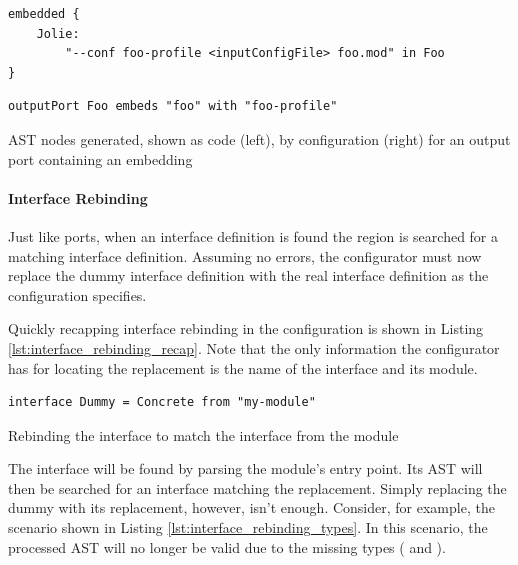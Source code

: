 \begin{listing}[H]
\begin{multicols}{2}

\begin{verbatim}
embedded {
    Jolie:
        "--conf foo-profile <inputConfigFile> foo.mod" in Foo
}
\end{verbatim}

\columnbreak

\begin{verbatim}
outputPort Foo embeds "foo" with "foo-profile"
\end{verbatim}

\end{multicols}

\caption{AST nodes generated, shown as code (left), by configuration (right)
    for an output port containing an embedding}

\label{lst:embedding_output}

\end{listing}

\paragraph{Interface Rebinding}

Just like ports, when an interface definition is found the  region
is searched for a matching interface definition. Assuming no errors, the
configurator must now replace the dummy interface definition with the real
interface definition as the configuration specifies.

Quickly recapping interface rebinding in the configuration is shown in Listing
\ref{lst:interface_rebinding_recap}. Note that the only information the
configurator has for locating the replacement is the name of the interface and
its module.

\begin{listing}[H]
\begin{verbatim}
interface Dummy = Concrete from "my-module"
\end{verbatim}

\caption{Rebinding the interface  to match the interface
     from the module }

\label{lst:interface_rebinding_recap}

\end{listing}

The interface will be found by parsing the module's entry point. Its AST will
then be searched for an interface matching the replacement. Simply replacing
the dummy with its replacement, however, isn't enough. Consider, for example,
the scenario shown in Listing \ref{lst:interface_rebinding_types}. In this
scenario, the processed AST will no longer be valid due to the missing types
( and ).

